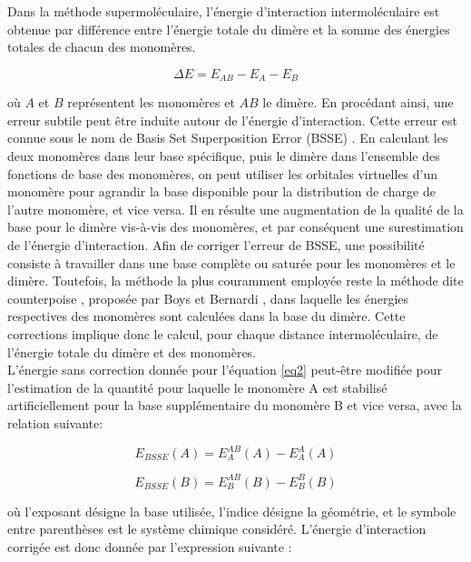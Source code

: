 	Dans la méthode supermoléculaire, l’énergie d’interaction intermoléculaire est obtenue par différence entre l’énergie totale du dimère et la somme des énergies totales de chacun des monomères.
	
	\begin{equation}
	\Delta E = E_{AB} - E_{A} - E_{B} \label{eq2}
	\end{equation}
	
	\noindent où $A$ et $B$ représentent les monomères et $AB$ le dimère. En procédant ainsi, une erreur subtile peut être induite autour de l’énergie d’interaction. Cette erreur est connue sous le nom de \og Basis Set Superposition Error \fg{} (BSSE) \cite{sherrill2010counterpoise}. En calculant les deux monomères dans leur base spécifique, puis le dimère dans l’ensemble des fonctions de base des monomères, on peut utiliser les orbitales virtuelles d’un monomère pour agrandir la base disponible pour la distribution de charge de l’autre monomère, et vice versa. Il en résulte une augmentation de la qualité de la base pour le dimère vis-à-vis des monomères, et par conséquent une surestimation de l’énergie d'interaction. Afin de corriger l’erreur de BSSE, une possibilité consiste à travailler dans une base complète ou saturée pour les monomères et le dimère. Toutefois, la méthode la plus couramment employée reste la méthode dite \og counterpoise \fg, proposée par Boys et Bernardi \cite{boys1970calculation}, dans laquelle les énergies respectives des monomères sont calculées dans la base du dimère. Cette corrections implique donc le calcul, pour chaque distance intermoléculaire, de l’énergie totale du dimère et des monomères.\\
	
	L’énergie sans correction donnée pour l’équation \ref{eq2} peut-être modifiée pour l'estimation de la quantité pour laquelle le monomère A est stabilisé artificiellement pour la base supplémentaire du monomère B et vice versa, avec la relation suivante:
	
	\begin{equation}
	E_{BSSE}(A) = E_{A}^{AB}(A) - E_{A}^{A}(A)
	\end{equation}
	
	\begin{equation}
	E_{BSSE}(B) = E_{B}^{AB}(B) - E_{B}^{B}(B)
	\end{equation}
	
	\noindent où l'exposant désigne la base utilisée, l'indice désigne la géométrie, et le symbole entre parenthèses est le système chimique considéré.
	L'énergie d'interaction corrigée est donc donnée par l'expression suivante :
	
